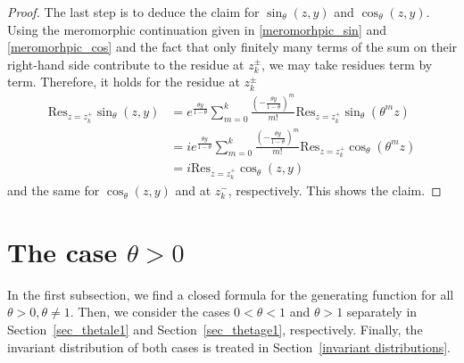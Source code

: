 \documentclass[12pt]{article}
\newcommand{\1}{\mathds{1}}
\theoremstyle{definition}
\theoremstyle{plain}
\theoremstyle{remark}
\begin{document}
\begin{proof}
    The last step is to deduce the claim for $\sin_\theta(z,y)$ and $\cos_\theta(z,y)$. Using  the meromorphic continuation given in \eqref{meromorhpic_sin} and \eqref{meromorhpic_cos} and the fact that only finitely many terms of the sum on their right-hand side contribute to the residue at $z_k^\pm$, we may take residues term by term. Therefore, it holds for the residue at $z_k^\pm$
    \begin{align*}
        \mathrm{Res}_{z=z_k^+}\sin_\theta(z,y)&=e^{\frac{\theta y}{1-\theta}}\sum_{m=0}^k\frac{\left(-\frac{\theta y}{1-\theta}\right)^m}{m!}\mathrm{Res}_{z=z_k^+}\sin_\theta(\theta^m z)
        \\&=ie^{\frac{\theta y}{1-\theta}}\sum_{m=0}^k\frac{\left(-\frac{\theta y}{1-\theta}\right)^m}{m!}\mathrm{Res}_{z=z_k^+}\cos_\theta(\theta^m z)
        \\&=i\mathrm{Res}_{z=z_k^+}\cos_\theta(z,y)
    \end{align*}
    and the same for $\cos_\theta(z,y)$ and at $z_k^-$, respectively. This shows the claim.
 \end{proof}
\section{The case \texorpdfstring{$\theta>0$}{theta>0}}\label{sec_theta_pos}
In the first subsection, we find a closed formula for the generating function for all $\theta>0,\theta\neq 1$.
Then, we consider the cases $0<\theta<1$ and $\theta>1$ separately in Section~\ref{sec_thetale1} and Section~\ref{sec_thetage1}, respectively. Finally, the invariant distribution of both cases is treated in Section~\ref{invariant distributions}.
\end{document}
